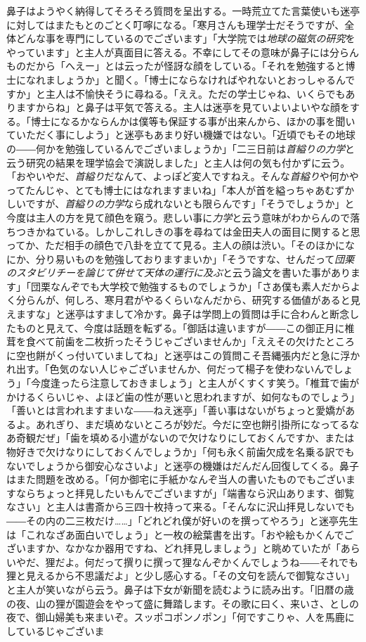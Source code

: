 \documentclass[12pt, openright]{book}
\begin{document}
鼻子はようやく納得してそろそろ質問を呈出する。一時荒立てた言葉使いも迷亭に対してはまたもとのごとく叮嚀になる。「寒月さんも理学士だそうですが、全体どんな事を専門にしているのでございます」「大学院では\emph{地球の磁気の研究}をやっています」と主人が真面目に答える。不幸にしてその意味が鼻子には分らんものだから「へえー」とは云ったが怪訝な顔をしている。「それを勉強すると博士になれましょうか」と聞く。「博士にならなければやれないとおっしゃるんですか」と主人は不愉快そうに尋ねる。「ええ。ただの学士じゃね、いくらでもありますからね」と鼻子は平気で答える。主人は迷亭を見ていよいよいやな顔をする。「博士になるかならんかは僕等も保証する事が出来んから、ほかの事を聞いていただく事にしよう」と迷亭もあまり好い機嫌ではない。「近頃でもその地球の――何かを勉強しているんでございましょうか」「二三日前は\emph{首縊りの力学}と云う研究の結果を理学協会で演説しました」と主人は何の気も付かずに云う。「おやいやだ、\emph{首縊り}だなんて、よっぽど変人ですねえ。そんな\emph{首縊り}や何かやってたんじゃ、とても博士にはなれますまいね」「本人が首を縊っちゃあむずかしいですが、\emph{首縊りの力学}なら成れないとも限らんです」「そうでしょうか」と今度は主人の方を見て顔色を窺う。悲しい事に\emph{力学}と云う意味がわからんので落ちつきかねている。しかしこれしきの事を尋ねては金田夫人の面目に関すると思ってか、ただ相手の顔色で八卦を立てて見る。主人の顔は渋い。「そのほかになにか、分り易いものを勉強しておりますまいか」「そうですな、せんだって\emph{団栗のスタビリチーを論じて併せて天体の運行に及ぶ}と云う論文を書いた事があります」「団栗なんぞでも大学校で勉強するものでしょうか」「さあ僕も素人だからよく分らんが、何しろ、寒月君がやるくらいなんだから、研究する価値があると見えますな」と迷亭はすまして冷かす。鼻子は学問上の質問は手に合わんと断念したものと見えて、今度は話題を転ずる。「御話は違いますが――この御正月に椎茸を食べて前歯を二枚折ったそうじゃございませんか」「ええその欠けたところに空也餅がくっ付いていましてね」と迷亭はこの質問こそ吾縄張内だと急に浮かれ出す。「色気のない人じゃございませんか、何だって楊子を使わないんでしょう」「今度逢ったら注意しておきましょう」と主人がくすくす笑う。「椎茸で歯がかけるくらいじゃ、よほど歯の性が悪いと思われますが、如何なものでしょう」「善いとは言われますまいな――ねえ迷亭」「善い事はないがちょっと愛嬌があるよ。あれぎり、まだ填めないところが妙だ。今だに空也餅引掛所になってるなあ奇観だぜ」「歯を填める小遣がないので欠けなりにしておくんですか、または物好きで欠けなりにしておくんでしょうか」「何も永く前歯欠成を名乗る訳でもないでしょうから御安心なさいよ」と迷亭の機嫌はだんだん回復してくる。鼻子はまた問題を改める。「何か御宅に手紙かなんぞ当人の書いたものでもございますならちょっと拝見したいもんでございますが」「端書なら沢山あります、御覧なさい」と主人は書斎から三四十枚持って来る。「そんなに沢山拝見しないでも――その内の二三枚だけ\ldots{}\ldots{}」「どれどれ僕が好いのを撰ってやろう」と迷亭先生は「これなざあ面白いでしょう」と一枚の絵葉書を出す。「おや絵もかくんでございますか、なかなか器用ですね、どれ拝見しましょう」と眺めていたが「あらいやだ、狸だよ。何だって撰りに撰って狸なんぞかくんでしょうね――それでも狸と見えるから不思議だよ」と少し感心する。「その文句を読んで御覧なさい」と主人が笑いながら云う。鼻子は下女が新聞を読むように読み出す。「旧暦の歳の夜、山の狸が園遊会をやって盛に舞踏します。その歌に曰く、来いさ、としの夜で、御山婦美も来まいぞ。スッポコポンノポン」「何ですこりゃ、人を馬鹿にしているじゃございま
\end{document}
